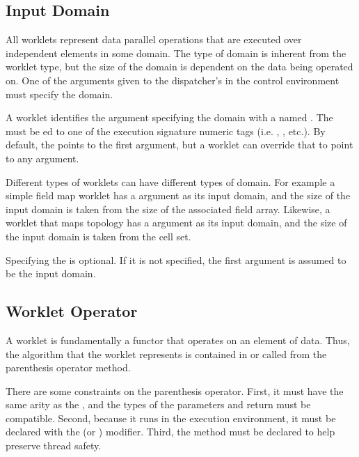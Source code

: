 \subsection{Input Domain}
\label{sec:InputDomain}


All worklets represent data parallel operations that are executed over
independent elements in some domain. The type of domain is inherent from
the worklet type, but the size of the domain is dependent on the data being
operated on. One of the arguments given to the dispatcher's
 in the control environment must specify the domain.

A worklet identifies the argument specifying the domain with a
 named . The  must be
ed to one of the execution signature numeric tags
(i.e. , , etc.). By default, the 
points to the first argument, but a worklet can override that to point to
any argument.


Different types of worklets can have different types of domain. For example
a simple field map worklet has a  argument as its input
domain, and the size of the input domain is taken from the size of the
associated field array. Likewise, a worklet that maps topology has a
 argument as its input domain, and the size of the input
domain is taken from the cell set.

Specifying the  is optional. If it is not specified, the first
argument is assumed to be the input domain.


\subsection{Worklet Operator}
\label{sec:WorkletOperator}

A worklet is fundamentally a functor that operates on an element of data.
Thus, the algorithm that the worklet represents is contained in or called
from the parenthesis operator method.


There are some constraints on the parenthesis operator. First, it must have
the same arity as the \executionsignature, and the types of the parameters
and return must be compatible. Second, because it runs in the execution
environment, it must be declared with the \vtkmexecmodifier (or
\vtkmexeccontmodifier) modifier. Third, the method must be declared
 to help preserve thread safety.

